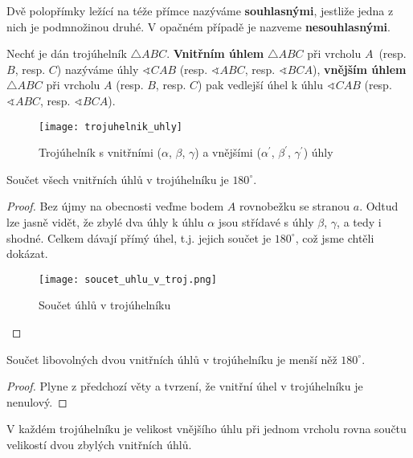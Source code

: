 \begin{definition}
  Dvě polopřímky ležící na téže přímce nazýváme \textbf{souhlasnými}, jestliže jedna z nich je podmnožinou druhé. V opačném případě je nazveme \textbf{nesouhlasnými}.
\end{definition}

\begin{definition}
  Nechť je dán trojúhelník $\triangle ABC$. \textbf{Vnitřním úhlem} $\triangle ABC$ při vrcholu $A$~(resp. $B$, resp. $C$)
  nazýváme úhly $\sphericalangle CAB$ (resp. $\sphericalangle ABC$, resp. $ \sphericalangle BCA$), \textbf{vnějším úhlem}
  $\triangle ABC$ při vrcholu $A$ (resp. $B$, resp. $C$) pak vedlejší úhel k úhlu $\sphericalangle CAB$ (resp. $\sphericalangle ABC$, resp. $\sphericalangle BCA$).
  \begin{figure}[ht!]
    \centering
    \texttt{[image: trojuhelnik\_uhly]}
    \caption{Trojúhelník s vnitřními ($\alpha$, $\beta$, $\gamma$) a
    vnějšími ($\alpha^\prime$, $\beta ^\prime$, $\gamma^\prime$) úhly}
    \label{}
  \end{figure}
\end{definition}

\begin{veta}
  Součet všech vnitřních úhlů v trojúhelníku je $180^\circ$.
\end{veta}

\begin{proof}
    Bez újmy na obecnosti veďme bodem $A$ rovnobežku se stranou $a$.
    Odtud lze jasně vidět, že zbylé dva úhly k úhlu $\alpha$ jsou střídavé s
    úhly $\beta$, $\gamma$, a tedy i shodné. Celkem dávají přímý úhel,
    t.j. jejich součet je $180^\circ$, což jsme chtěli dokázat.
    \begin{figure}[ht!]
      \centering
      \texttt{[image: soucet\_uhlu\_v\_troj.png]}
      \caption{Součet úhlů v trojúhelníku}
    \end{figure}
\end{proof}


\begin{veta}
  Součet libovolných dvou vnitřních úhlů v trojúhelníku je menší něž $180^\circ$.
\end{veta}

\begin{proof}
  Plyne z předchozí věty a tvrzení, že vnitřní úhel v trojúhelníku je nenulový.
\end{proof}

\begin{veta}
  V každém trojúhelníku je velikost vnějšího úhlu při jednom vrcholu rovna součtu velikostí dvou zbylých vnitřních úhlů.
\end{veta}

